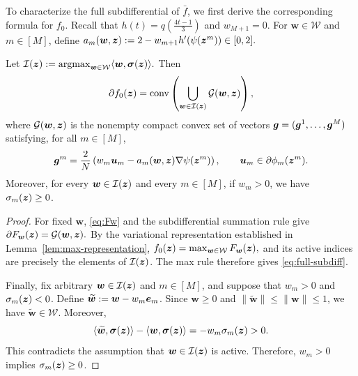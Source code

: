 To characterize the full subdifferential of $\bar f$, we first
derive the corresponding formula for $f_0$.
Recall that $h(t)=q(\tfrac{4t-1}{3})$ and $w_{M+1}=0$.
For $\bm w\in\mathcal W$ and $m\in[M]$, define
$
 a_m(\bm w,\bm{z})
 :=
 2-w_{m+1}h'(\psi(\bm{z}^m))
 \in[0,2].
$  
\begin{lemma}
\label{lem:full-subdiff}
Let $
 \mathcal I(\bm{z})
 :=
 \operatorname*{argmax}_{\bm w\in\mathcal W}
 \langle\bm w,\boldsymbol\sigma(\bm{z})\rangle.
$
Then
\begin{equation}
\label{eq:full-subdiff}
 \partial f_0(\bm{z})
 =
 \operatorname{conv}
 \left(
 \bigcup_{\bm w\in\mathcal I(\bm{z})}
 \mathcal G(\bm w,\bm{z})
 \right),
\end{equation}
where $\mathcal G(\bm w,\bm{z})$ is the nonempty compact
convex set of vectors $\bm{g}=(\bm{g}^1,\ldots,\bm{g}^M)$ satisfying, for all $m \in [M]$,
\begin{equation}
\label{eq:block-subgradient}
 \bm{g}^m
 =
 \frac2N
 \left(
 w_m\bm u_m
 -
 a_m(\bm w,\bm{z})\nabla\psi(\bm{z}^m)
 \right),
 \qquad
 \bm u_m\in\partial\phi_m(\bm{z}^m).
\end{equation}
Moreover, for every \(\bm{w}\in\mathcal I(\bm{z})\) and every \(m\in[M]\), if $w_m>0$, we have
$\sigma_m(\bm{z})\geq0$.
\end{lemma}
\begin{proof}
For fixed $\bm w$, \eqref{eq:Fw} and the
subdifferential summation rule
\cite[Corollary 10.9]{rockafellar2009variational} give
$
 \partial F_{\bm w}(\bm{z})=\mathcal G(\bm w,\bm{z}).
$
By the variational representation established in
Lemma~\ref{lem:max-representation},
$
 f_0(\bm{z})=\max_{\bm w\in\mathcal W}F_{\bm w}(\bm{z}),
$
and its active indices are precisely the elements of
$\mathcal I(\bm{z})$.
The max rule
\cite[Theorem 10.31]{rockafellar2009variational}
therefore gives \eqref{eq:full-subdiff}.

Finally, fix arbitrary $\bm w\in\mathcal I(\bm{z})$
and $m\in[M]$, and suppose that $w_m>0$ and
$\sigma_m(\bm{z})<0$.
Define
$\widetilde{\bm w}:=\bm w-w_m\bm{e}_m$.
Since $\bm w\ge0$ and
$\|\widetilde{\bm w}\|\le\|\bm w\|\le1$,
we have $\widetilde{\bm w}\in\mathcal W$.
Moreover,
\[
 \langle\widetilde{\bm w},\boldsymbol\sigma(\bm{z})\rangle
 -
 \langle\bm w,\boldsymbol\sigma(\bm{z})\rangle
 =
 -w_m\sigma_m(\bm{z})
 >0.
\]
This contradicts the assumption that
$\bm w\in\mathcal I(\bm{z})$ is active.
Therefore, $w_m>0$ implies $\sigma_m(\bm{z})\ge0$.
\end{proof}

